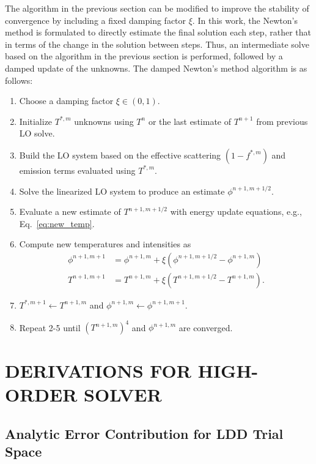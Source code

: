 The algorithm in the previous section can be modified to improve the stability of
convergence by including a fixed damping factor $\xi$.  In this work, the Newton's method is
formulated to directly estimate the final solution each step, rather that in terms of the
change in the solution between steps.  Thus, an intermediate solve based on the algorithm in the previous section is performed, followed by a damped update of the unknowns. 
The damped Newton's method algorithm is as
follows:
\begin{enumerate}
    \item Choose a damping factor $\xi\in(0,1)$.
    \item Initialize $T^{*,m}$ unknowns using $T^n$ or the last estimate of $T^{n+1}$ from
        previous LO solve.
    \item  Build the LO system based on the effective scattering $(1-f^{*,m})$ and emission terms
        evaluated using $T^{*,m}$.
    \item Solve the linearized LO system to produce an estimate $\phi^{n+1,m+1/2}$.
    \item Evaluate a new estimate of $T^{n+1,m+1/2}$ with energy update equations, e.g., Eq.~\eqref{eq:new_temp}.
    \item Compute new temperatures and intensities as
        \begin{align*}
            \phi^{n+1,m+1} &= \phi^{n+1,m}+ \xi \left( \phi^{n+1,m+1/2} - \phi^{n+1,m} \right)\\
            T^{n+1,m+1} &= T^{n+1,m}+ \xi \left( T^{n+1,m+1/2} - T^{n+1,m} \right).
           \end{align*}
       \item $T^{*,m+1}\leftarrow{T}^{n+1,m}$ and $\phi^{n+1,m} \leftarrow
           \phi^{n+1,m+1}$.
    \item Repeat 2-5 until $(T^{n+1,m})^4$ and $\phi^{n+1,m}$ are converged.
\end{enumerate}

\chapter{\uppercase{Derivations for High-Order Solver}}

\section{Analytic Error Contribution for LDD Trial Space}
\label{sec:face_err_deriv}

